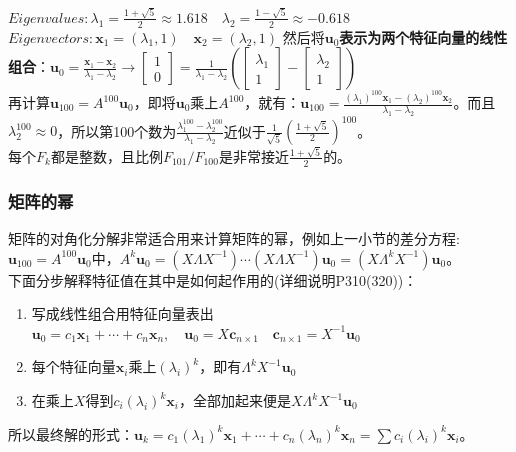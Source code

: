 \documentclass[UTF8]{article}
\begin{document}
    $Eigenvalues: \lambda_1 = \frac{1+\sqrt{5}}{2} \approx 1.618 \quad \lambda_2 = \frac{1-\sqrt{5}}{2} \approx -0.618$\\
    $Eigenvectors: \bm{x}_1 = (\lambda_1,1)\quad \bm{x}_2 = (\lambda_2,1)$
    然后将$\bm{u}_0$\textbf{表示为两个特征向量的线性组合}：$\bm{u}_0 =\frac{\bm{x}_1-\bm{x}_2}{\lambda_1 - \lambda_2} \rightarrow \left[\begin{array}{c} 1 \\ 0 \end{array}\right]= \frac{1}{\lambda_1 - \lambda_2}\left(\left[\begin{array}{c} \lambda_1 \\ 1 \end{array}\right]- \left[\begin{array}{c} \lambda_2 \\ 1 \end{array}\right]\right)$
    \\
    再计算$\bm{u}_{100} = A^{100} \bm{u}_0$，即将$\bm{u}_0$乘上$A^{100}$，就有：$\bm{u}_{100}= \frac{(\lambda_1)^{100}\bm{x}_1 - (\lambda_2)^{100}\bm{x}_2}{\lambda_1 - \lambda_2}$。而且$\lambda_2^{100} \approx 0$，所以第100个数为$\frac{\lambda_1^{100} - \lambda_2^{100}}{\lambda_1 - \lambda_2}$近似于$\frac{1}{\sqrt{5}}\left(\frac{1+\sqrt{5}}{2}\right)^{100}$。
    \\
    每个$F_k$都是整数，且比例$F_101 / F_100$是非常接近$\frac{1+\sqrt{5}}{2}$的。

    \subsubsection{矩阵的幂}
    矩阵的对角化分解非常适合用来计算矩阵的幂，例如上一小节的差分方程:$\bm{u}_{100} = A^{100} \bm{u}_0$中，$A^{k}\bm{u}_0=(X\Lambda X^{-1})\cdots (X\Lambda X^{-1})\bm{u}_0=(X\Lambda^{k} X^{-1})\bm{u}_0$。
    \\
    下面分步解释特征值在其中是如何起作用的(详细说明P310(320))：
    \begin{enumerate}
        \item 写成线性组合用特征向量表出$\bm{u}_0 = c_1\bm{x}_1 + \cdots + c_n\bm{x}_n, \quad  \bm{u}_0= X \bm{c}_{n\times 1} \quad \bm{c}_{n\times 1}= X^{-1}\bm{u}_0$
        \item 每个特征向量$\bm{x}_i$乘上$(\lambda_i)^k$，即有$\Lambda^k X^{-1}\bm{u}_0$
        \item 在乘上$X$得到$c_i (\lambda_i)^k\bm{x}_i$，全部加起来便是$X\Lambda^{k} X^{-1}\bm{u}_0$
    \end{enumerate}
    所以最终解的形式：$\bm{u}_k =c_1 (\lambda_1)^k\bm{x}_1+\cdots +c_n (\lambda_n)^k\bm{x}_n =\sum{ c_i (\lambda_i)^k\bm{x}_i}$。
\end{document}
